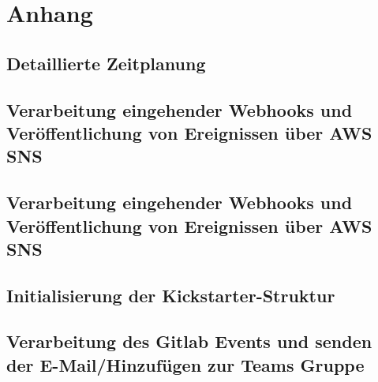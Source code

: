 \section{Anhang}
\subsection{Detaillierte Zeitplanung}
\label{app:Zeitplanung}

\clearpage


\clearpage




\clearpage

\clearpage

\clearpage


\subsection{Verarbeitung eingehender Webhooks und Veröffentlichung von Ereignissen über AWS SNS}
\label{app:CNMI}

\clearpage

\subsection{Verarbeitung eingehender Webhooks und Veröffentlichung von Ereignissen über AWS SNS}
\label{app:CNMI}

\clearpage

\subsection{Initialisierung der Kickstarter-Struktur}
\label{app:kickStruct}

\clearpage

\subsection{Verarbeitung des Gitlab Events und senden der E-Mail/Hinzufügen zur Teams Gruppe}
\label{app:kickMain}

\clearpage

